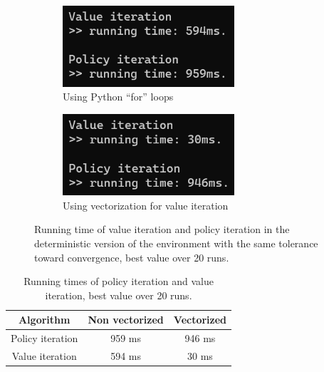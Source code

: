 \documentclass[a4paper]{article}
\begin{document}
\begin{figure}[h!]
	\centering
	\begin{subfigure}[b]{0.45\textwidth}
		\centering
		\includegraphics[width=0.7\textwidth]{plots/running_time.png}
		\caption{Using Python ``for'' loops}
	\end{subfigure}
	\hfill
	\begin{subfigure}[b]{0.45\textwidth}
		\centering
		\includegraphics[width=0.7\textwidth]{plots/running_time_vect.png}
		\caption{Using vectorization for value iteration}
	\end{subfigure}
	\caption{Running time of value iteration and policy iteration in the deterministic version of the environment with the same tolerance toward convergence, best value over 20 runs.}
	\label{fig:running_time}
\end{figure}

\begin{table}[h!]
	\centering
	\begin{tabular}{||c c c||} 
		\hline
		Algorithm & Non vectorized & Vectorized \\ [0.5ex] 
		\hline\hline
		Policy iteration & 959 ms & 946 ms \\ 
		\hline
		Value iteration & 594 ms & 30 ms \\
		\hline
	\end{tabular}
	\caption{Running times of policy iteration and value iteration, best value over 20 runs.}
	\label{table:running_time}
\end{table}
\end{document}
